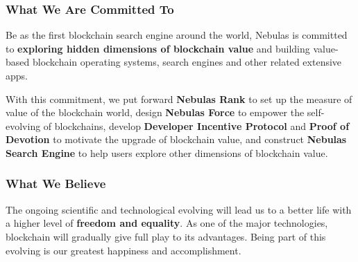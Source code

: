 
\subsubsection*{What We Are Committed To}

Be as the first blockchain search engine around the world, Nebulas is committed to \textbf{exploring hidden dimensions of blockchain value} and building value-based blockchain operating systems, search engines and other related extensive apps.


With this commitment, we put forward \textbf{Nebulas Rank} to set up the measure of value of the blockchain world, design \textbf{Nebulas Force} to empower the self-evolving of blockchains, develop \textbf{Developer Incentive Protocol} and \textbf{Proof of Devotion} to motivate the upgrade of blockchain value, and construct \textbf{Nebulas Search Engine} to help users explore other dimensions of blockchain value.


\subsubsection*{What We Believe}

The ongoing scientific and technological evolving will lead us to a better life with a higher level of \textbf{freedom and equality}. As one of the major technologies, blockchain will gradually give full play to its advantages. Being part of this evolving is our greatest happiness and accomplishment.


